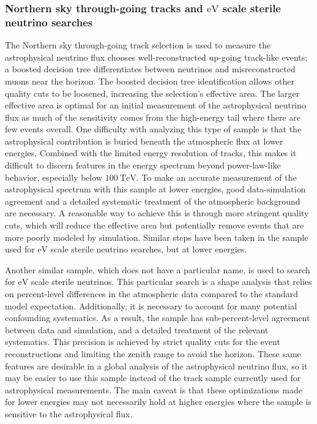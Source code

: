 \subsubsection{Northern sky through-going tracks and $\si\eV$ scale sterile neutrino searches}
The Northern sky through-going track selection is used to measure the astrophysical neutrino flux chooses well-reconstructed up-going track-like events; a boosted decision tree differentiates between neutrinos and misreconstructed muons near the horizon.
The boosted decision tree identification allows other quality cuts to be loosened, increasing the selection's effective area.
The larger effective area is optimal for an initial measurement of the astrophysical neutrino flux as much of the sensitivity comes from the high-energy tail where there are few events overall.
One difficulty with analyzing this type of sample is that the astrophysical contribution is buried beneath the atmospheric flux at lower energies.
Combined with the limited energy resolution of tracks, this makes it difficult to discern features in the energy spectrum beyond power-law-like behavior, especially below $\SI{100}\TeV$.
To make an accurate measurement of the astrophysical spectrum with this sample at lower energies, good data-simulation agreement and a detailed systematic treatment of the atmospheric background are necessary.
A reasonable way to achieve this is through more stringent quality cuts, which will reduce the effective area but potentially remove events that are more poorly modeled by simulation.
Similar steps have been taken in the sample used for $\si\eV$ scale sterile neutrino searches, but at lower energies.

Another similar sample, which does not have a particular name, is used to search for $\si\eV$ scale sterile neutrinos.
This particular search is a shape analysis that relies on percent-level differences in the atmospheric data compared to the standard model expectation.
Additionally, it is necessary to account for many potential confounding systematics.
As a result, the sample has sub-percent-level agreement between data and simulation, and a detailed treatment of the relevant systematics.
This precision is achieved by strict quality cuts for the event reconstructions and limiting the zenith range to avoid the horizon.
These same features are desirable in a global analysis of the astrophysical neutrino flux, so it may be easier to use this sample instead of the track sample currently used for astrophysical measurements.
The main caveat is that these optimizations made for lower energies may not necessarily hold at higher energies where the sample is sensitive to the astrophysical flux.

